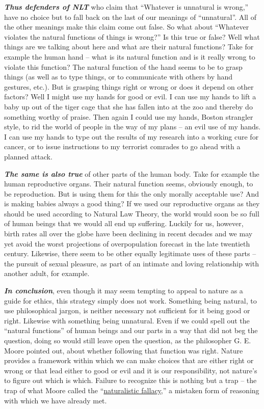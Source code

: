 \documentclass[12pt, openany]{book}
\begin{document}
\textbf{\emph{Thus defenders of NLT}} who claim that ``Whatever is unnatural is wrong,'' have no choice but to fall back on the last of our meanings of ``unnatural''. All of the other meanings make this claim come out false. So what about ``Whatever violates the natural functions of things is wrong?'' Is this true or false? Well what things are we talking about here and what are their natural functions? Take for example the human hand -- what is its natural function and is it really wrong to violate this function? The natural function of the hand seems to be to grasp things (as well as to type things, or to communicate with others by hand gestures, etc.). But is grasping things right or wrong or does it depend on other factors? Well I might use my hands for good or evil. I can use my hands to lift a baby up out of the tiger cage that she has fallen into at the zoo and thereby do something worthy of praise. Then again I could use my hands, Boston strangler style, to rid the world of people in the way of my plans -- an evil use of my hands. I can use my hands to type out the results of my research into a working cure for cancer, or to issue instructions to my terrorist comrades to go ahead with a planned attack.

\textbf{\emph{The same is also true}} of other parts of the human body. Take for example the human reproductive organs. Their natural function seems, obviously enough, to be reproduction. But is using them for this the only morally acceptable use? And is making babies always a good thing? If we used our reproductive organs as they should be used according to Natural Law Theory, the world would soon be so full of human beings that we would all end up suffering. Luckily for us, however, birth rates all over the globe have been declining in recent decades and we may yet avoid the worst projections of overpopulation forecast in the late twentieth century. Likewise, there seem to be other equally legitimate uses of these parts -- the pursuit of sexual pleasure, as part of an intimate and loving relationship with another adult, for example.

\textbf{\emph{In conclusion}}, even though it may seem tempting to appeal to nature as a guide for ethics, this strategy simply does not work. Something being natural, to use philosophical jargon, is neither necessary not sufficient for it being good or right. Likewise with something being unnatural. Even if we could spell out the ``natural functions'' of human beings and our parts in a way that did not beg the question, doing so would still leave open the question, as the philosopher G. E. Moore pointed out, about whether following that function was right. Nature provides a framework within which we can make choices that are either right or wrong or that lead either to good or evil and it is our responsibility, not nature's to figure out which is which. Failure to recognize this is nothing but a trap -- the trap of what Moore called the ``\protect\hyperlink{the-naturalistic-fallacy}{naturalistic fallacy},'' a mistaken form of reasoning with which we have already met.
\end{document}
